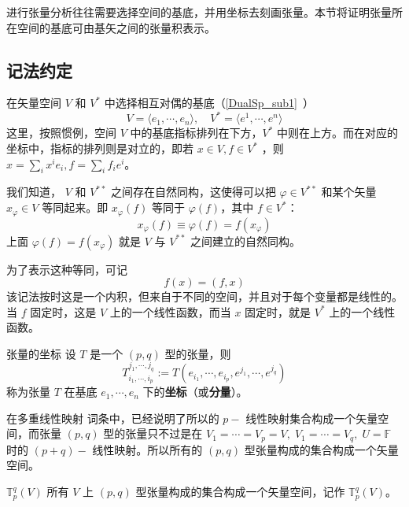 
\begin{issues}
\issueDraft
\end{issues}

进行张量分析往往需要选择空间的基底，并用坐标去刻画张量。本节将证明张量所在空间的基底可由基矢之间的张量积表示。
\subsection{记法约定}
在矢量空间 $V$ 和 $V^*$ 中选择相互对偶的基底（\autoref{DualSp_sub1}~）
\begin{equation}
V=\langle e_1,\cdots ,e_n\rangle,\quad V^*=\langle e^1,\cdots,e^n\rangle
\end{equation}
这里，按照惯例，空间 $V$ 中的基底指标排列在下方，$V^*$ 中则在上方。而在对应的坐标中，指标的排列则是对立的，即若 $x\in V,f\in V^*$ ，则 $x=\sum_{i}x^i e_i,f=\sum_{i}f_ie^i$。

我们知道， $V$ 和 $V^{**}$ 之间存在自然同构，这使得可以把 $\varphi\in V^{**}$ 和某个矢量 $x_{\varphi}\in V$ 等同起来。即 $x_{\varphi}(f)$ 等同于 $\varphi(f)$，其中 $f\in V^*$：
\begin{equation}
x_{\varphi}(f)\equiv\varphi(f)=f(x_{\varphi})
\end{equation}
上面 $\varphi(f)=f(x_{\varphi})$ 就是 $V$ 与 $V^{**}$ 之间建立的自然同构。

为了表示这种等同，可记
\begin{equation}\label{CofTen_eq4}
f(x)=(f,x)
\end{equation}
该记法按时这是一个内积，但来自于不同的空间，并且对于每个变量都是线性的。当 $f$ 固定时，这是 $V$ 上的一个线性函数，而当 $x$ 固定时，就是 $V^{*}$ 上的一个线性函数。
\begin{definition}{张量的坐标}\label{CofTen_def2}
设 $T$ 是一个 $(p,q)$ 型的张量，则
\begin{equation}
T^{j_1,\cdots,j_q}_{i_1,\cdots,i_p}:=T(e_{i_1},\cdots,e_{i_p},e^{j_1},\cdots,e^{j_q})
\end{equation}
称为张量 $T$ 在基底 ${e_1,\cdots,e_n}$ 下的\textbf{坐标}（或\textbf{分量}）。
\end{definition}

在多重线性映射 词条中，已经说明了所以的 $p-$ 线性映射集合构成一个矢量空间，而张量 $(p,q)$ 型的张量只不过是在 $V_1=\cdots=V_p=V,\;V_1=\cdots=V_q,\;U=\mathbb F$ 时的 $(p+q)-$ 线性映射。所以所有的 $(p,q)$ 型张量构成的集合构成一个矢量空间。
\begin{definition}{$\mathbb T^q_p(V)$}\label{CofTen_def1}
所有 $V$ 上 $(p,q)$ 型张量构成的集合构成一个矢量空间，记作 $\mathbb T^q_p(V)$。
\end{definition} 
